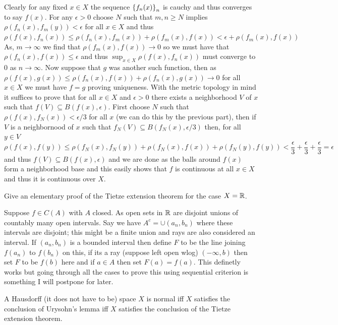 \documentclass[12pt,a4paper]{article}
\begin{document}
\begin{solution}
    Clearly for any fixed $x\in X$ the sequence $ \qty{f_n(x)}_{n}$ is cauchy and thus converges to say $f(x).$ 
    For any $\epsilon>0$ choose $N$ such that $m,n\geq N$ implies $\rho(f_n(x),f_m(y))<\epsilon$ for all $x\in X$ and thus $\rho(f(x),f_n(x))\leq\rho(f_n(x),f_m(x))+\rho(f_m(x),f(x))<\epsilon+\rho(f_m(x),f(x))$ 
    As, $m\to\infty$ we find that $\rho(f_m(x),f(x))\to 0$ so we must have that $\rho(f_n(x),f(x))\leq\epsilon$ and thus $\sup_{x\in X}\rho(f(x),f_n(x))$ must converge to $0$ as $n\to\infty.$ 
    Now suppose that $g$ was another such function, then as $\rho(f(x),g(x))\leq\rho(f_n(x),f(x))+\rho(f_n(x),g(x))\to 0$ for all $x\in X$ we must have $f=g$ proving uniqueness. 
   With the metric topology in mind it suffices to prove that for all $x\in X$ and $\epsilon>0$ there exists a neighborhood $V$ of $x$ such that $f(V)\subseteq B(f(x),\epsilon)$. 
   First choose $N$ such that $\rho(f(x),f_N(x))<\epsilon/3$ for all $x$ (we can do this by the previous part), then if $V$ is a neighbornood of $x$ such that $f_N(V)\subseteq B(f_N(x),\epsilon/3)$ then, for all $y\in V$
   \[
   \rho(f(x),f(y))\leq\rho(f_N(x),f_N(y))+\rho(f_N(x),f(x))+\rho(f_N(y),f(y))< \frac{\epsilon}{3}+\frac{\epsilon}{3}+\frac{\epsilon}{3}=\epsilon 
   \]
   and thus $f(V)\subseteq B(f(x),\epsilon)$ and we are done as the balls around $f(x)$ form a neighborhood base and this easily shows that $f$ is continuous at all $x\in X$ and thus it is continuous over $X. $ 
\end{solution}
\begin{problem}\label{prob:4-23}
Give an elementary proof of the Tietze extension theorem for the case $X = \mathbb{R}$.
\end{problem}
\begin{solution}
    Suppose $f\in C(A)$ with $A$ closed. 
    As open sets in $\mathbb{R}$ are disjoint unions of countably many open intervals. 
    Say we have $A^c=\cup (a_n,b_n)$ where these intervals are disjoint; this might be a finite union and rays are also considered an interval. 
    If $(a_n,b_n)$ is a bounded interval then define $F$ to be the line joining $f(a_n)$ to $f(b_n)$ on this, if its a ray (suppose left open wlog) $(-\infty,b)$ then set $F$ to be $f(b)$ here and if $a\in A$ then set $F(a)=f(a).$ 
    This definetly works but going through all the cases to prove this using sequential criterion is something I will postpone for later.   
\end{solution}
\begin{problem}\label{prob:4-24}
A Hausdorff (it does not have to be) space $X$ is normal iff $X$ satisfies the conclusion of Urysohn's lemma iff $X$ satisfies the conclusion of the Tietze extension theorem.
\end{problem}
\end{document}
